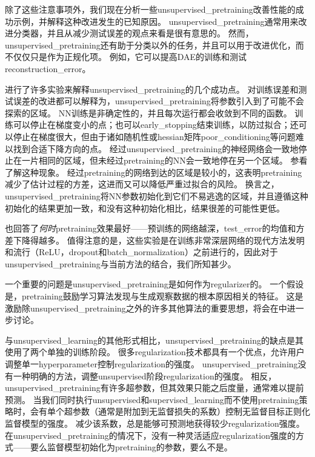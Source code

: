 除了这些注意事项外，我们现在分析一些\gls{unsupervised_pretraining}改善性能的成功示例，并解释这种改进发生的已知原因。
\gls{unsupervised_pretraining}通常用来改进分类器，并且从减少测试误差的观点来看是很有意思的。
然而，\gls{unsupervised_pretraining}还有助于分类以外的任务，并且可以用于改进优化，而不仅仅只是作为正规化项。
例如，它可以提高\gls{DAE}的训练和测试\gls{reconstruction_error}\citep{Hinton-Science2006}。


\cite{Erhan+al-2010-small}进行了许多实验来解释\gls{unsupervised_pretraining}的几个成功点。
对训练误差和测试误差的改进都可以解释为，\gls{unsupervised_pretraining}将参数引入到了可能不会探索的区域。
\gls{NN}训练是非确定性的，并且每次运行都会收敛到不同的函数。
训练可以停止在梯度变小的点；也可以\gls{early_stopping}结束训练，以防过拟合；还可以停止在梯度很大，但由于诸如随机性或\gls{hessian}矩阵\gls{poor_conditioning}等问题难以找到合适下降方向的点。
经过\gls{unsupervised_pretraining}的神经网络会一致地停止在一片相同的区域，但未经过\gls{pretraining}的\gls{NN}会一致地停在另一个区域。
参看了解这种现象。
经过\gls{pretraining}的网络到达的区域是较小的，这表明\gls{pretraining}减少了估计过程的方差，这进而又可以降低严重过拟合的风险。
换言之，\gls{unsupervised_pretraining}将\gls{NN}参数初始化到它们不易逃逸的区域，并且遵循这种初始化的结果更加一致，和没有这种初始化相比，结果很差的可能性更低。


\cite{Erhan+al-2010-small}也回答了\emph{何时}\gls{pretraining}效果最好——预训练的网络越深，\gls{test_error}的均值和方差下降得越多。
值得注意的是，这些实验是在训练非常深层网络的现代方法发明和流行（\gls{ReLU}，\gls{dropout}和\gls{batch_normalization}）之前进行的，因此对于\gls{unsupervised_pretraining}与当前方法的结合，我们所知甚少。


一个重要的问题是\gls{unsupervised_pretraining}是如何作为\gls{regularizer}的。
一个假设是，\gls{pretraining}鼓励学习算法发现与生成观察数据的根本原因相关的特征。
这是激励除\gls{unsupervised_pretraining}之外的许多其他算法的重要思想，将会在中进一步讨论。


与\gls{unsupervised_learning}的其他形式相比，\gls{unsupervised_pretraining}的缺点是其使用了两个单独的训练阶段。
很多\gls{regularization}技术都具有一个优点，允许用户调整单一\gls{hyperparameter}控制\gls{regularization}的强度。
\gls{unsupervised_pretraining}没有一种明确的方法，调整\gls{unsupervised}阶段\gls{regularization}的强度。
相反，\gls{unsupervised_pretraining}有许多超参数，但其效果只能之后度量，通常难以提前预测。
当我们同时执行\gls{unsupervised}和\gls{supervised_learning}而不使用\gls{pretraining}策略时，会有单个超参数（通常是附加到无监督损失的系数）控制无监督目标正则化监督模型的强度。
减少该系数，总是能够可预测地获得较少\gls{regularization}强度。
在\gls{unsupervised_pretraining}的情况下，没有一种灵活适应\gls{regularization}强度的方式——要么监督模型初始化为\gls{pretraining}的参数，要么不是。

